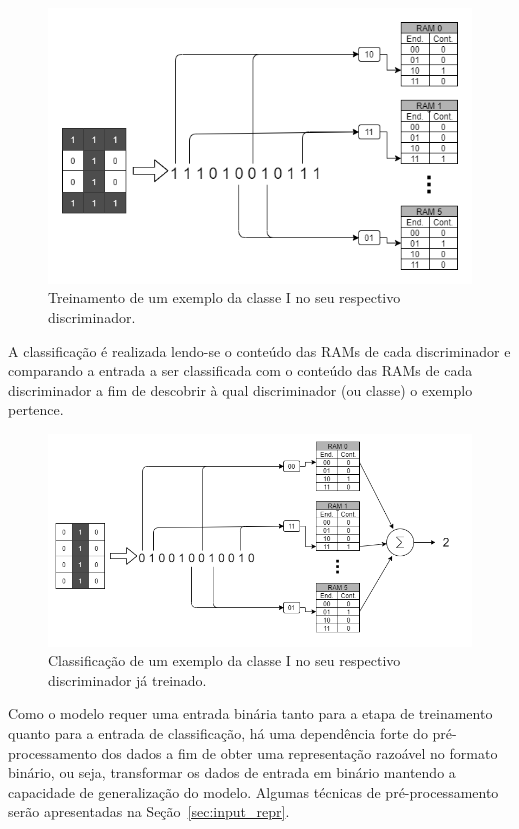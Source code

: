 \begin{figure}[!ht] \label{fig:wsd_train}
    \centering
    \includegraphics[width=5.0in]{img/wisard_training.png}
    \caption{Treinamento de um exemplo da classe I no seu respectivo discriminador.}
\end{figure}

A classificação é realizada lendo-se o conteúdo das RAMs de cada discriminador e comparando a entrada a ser classificada com o conteúdo das RAMs de cada discriminador a fim de descobrir à qual discriminador (ou classe) o exemplo pertence.

\begin{figure}[!ht] \label{fig:wsd_classification}
    \centering
    \includegraphics[width=5.0in]{img/wisard_classification.png}
    \caption{Classificação de um exemplo da classe I no seu respectivo discriminador já treinado.}
\end{figure}

Como o modelo requer uma entrada binária tanto para a etapa de treinamento quanto para a entrada de classificação, há uma dependência forte do pré-processamento dos dados a fim de obter uma representação razoável no formato binário, ou seja, transformar os dados de entrada em binário mantendo a capacidade de generalização do modelo. Algumas técnicas de pré-processamento serão apresentadas na Seção~\ref{sec:input_repr}.

